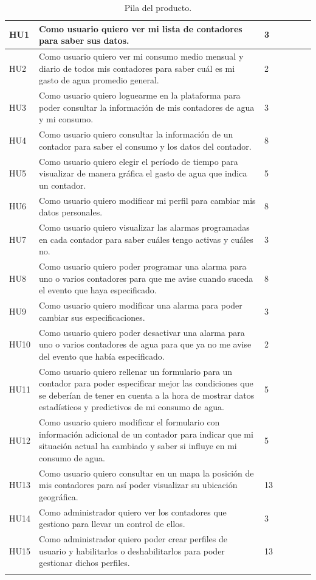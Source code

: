 \documentclass[pdftex,11pt,a4paper]{book}
\begin{document}
\begin{center}
\begin{longtable}{|>{\centering\arraybackslash}X m{}|m{}|>{\centering\arraybackslash}X m{}|>{\centering\arraybackslash}X m{}|}
HU1 & Como usuario quiero ver mi lista de contadores para saber sus datos. & 3 & 1 \\ \hline
HU2 & Como usuario quiero ver mi consumo medio mensual y diario de todos mis contadores para saber cuál es mi gasto de agua promedio general. & 2 & 3 \\ \hline
HU3 & Como usuario quiero loguearme en la plataforma para poder consultar la información de mis contadores de agua y mi consumo. & 3 & 2 \\ \hline
HU4 & Como usuario quiero consultar la información de un contador para saber el consumo y los datos del contador. & 8 & 4 \\ \hline
HU5 & Como usuario quiero elegir el período de tiempo para visualizar de manera gráfica el gasto de agua que indica un contador. & 5 & 5 \\ \hline
HU6 & Como usuario quiero modificar mi perfil para cambiar mis datos personales. & 8 & 6 \\ \hline
HU7 & Como usuario quiero visualizar las alarmas programadas en cada contador para saber cuáles tengo activas y cuáles no. & 3 & 7 \\ \hline
HU8 & Como usuario quiero poder programar una alarma para uno o varios contadores para que me avise cuando suceda el evento que haya especificado. & 8 & 8 \\ \hline
HU9 & Como usuario quiero modificar una alarma para poder cambiar sus especificaciones. & 3 & 10 \\ \hline
HU10 & Como usuario quiero poder desactivar una alarma para uno o varios contadores de agua para que ya no me avise del evento que había especificado. & 2 & 9 \\ \hline
HU11 & Como usuario quiero rellenar un formulario para un contador para poder especificar mejor las condiciones que se deberían de tener en cuenta a la hora de mostrar datos estadísticos y predictivos de mi consumo de agua. & 5 & 11 \\ \hline
HU12 & Como usuario quiero modificar el formulario con información adicional de un contador para indicar que mi situación actual ha cambiado y saber si influye en mi consumo de agua. & 5 & 12 \\ \hline
HU13 & Como usuario quiero consultar en un mapa la posición de mis contadores para así poder visualizar su ubicación geográfica. & 13 & 13 \\ \hline
HU14 & Como administrador quiero ver los contadores que gestiono para llevar un control de ellos. & 3 & 15 \\ \hline
HU15 & Como administrador quiero poder crear perfiles de usuario y habilitarlos o deshabilitarlos para poder gestionar dichos perfiles. & 13 & 14 \\ \hline
\caption{Pila del producto.} \label{tablalarga:tablaHU}
\end{longtable}
\end{center}
\end{document}
